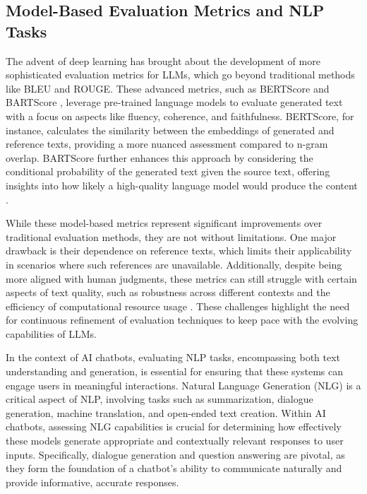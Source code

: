 \subsection{Model-Based Evaluation Metrics and NLP Tasks}

The advent of deep learning has brought about the development of more sophisticated evaluation metrics for LLMs, which go beyond traditional methods like BLEU and ROUGE. These advanced metrics, such as BERTScore and BARTScore \cite{zhang2019bertscore, yuan2021bartscore}, leverage pre-trained language models to evaluate generated text with a focus on aspects like fluency, coherence, and faithfulness. BERTScore, for instance, calculates the similarity between the embeddings of generated and reference texts, providing a more nuanced assessment compared to n-gram overlap. BARTScore further enhances this approach by considering the conditional probability of the generated text given the source text, offering insights into how likely a high-quality language model would produce the content \cite{gao2023retrieval}.

While these model-based metrics represent significant improvements over traditional evaluation methods, they are not without limitations. One major drawback is their dependence on reference texts, which limits their applicability in scenarios where such references are unavailable. Additionally, despite being more aligned with human judgments, these metrics can still struggle with certain aspects of text quality, such as robustness across different contexts and the efficiency of computational resource usage \cite{he2022blind}. These challenges highlight the need for continuous refinement of evaluation techniques to keep pace with the evolving capabilities of LLMs.

In the context of AI chatbots, evaluating NLP tasks, encompassing both text understanding and generation, is essential for ensuring that these systems can engage users in meaningful interactions. Natural Language Generation (NLG) is a critical aspect of NLP, involving tasks such as summarization, dialogue generation, machine translation, and open-ended text creation. Within AI chatbots, assessing NLG capabilities is crucial for determining how effectively these models generate appropriate and contextually relevant responses to user inputs. Specifically, dialogue generation and question answering are pivotal, as they form the foundation of a chatbot’s ability to communicate naturally and provide informative, accurate responses.

